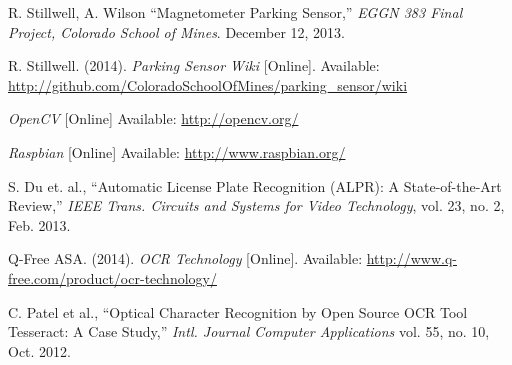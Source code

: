 \documentclass[11pt, oneside, fullpage, doublespace]{article}
\begin{document}
\begin{thebibliography}{99}
 R. Stillwell, A. Wilson ``Magnetometer Parking Sensor,'' \emph{EGGN 383 Final Project, Colorado School of Mines}. December 12, 2013.

 R. Stillwell. (2014). \emph{Parking Sensor Wiki} [Online]. Available: \url{http://github.com/ColoradoSchoolOfMines/parking_sensor/wiki}

 \emph{OpenCV} [Online] Available: \url{http://opencv.org/}

 \emph{Raspbian} [Online] Available: \url{http://www.raspbian.org/}

 S. Du et. al., ``Automatic License Plate Recognition (ALPR): A State-of-the-Art Review,'' \emph{IEEE Trans. Circuits and Systems for Video Technology}, vol. 23, no. 2, Feb. 2013.

 Q-Free ASA. (2014). \emph{OCR Technology} [Online]. Available: \url{http://www.q-free.com/product/ocr-technology/}

 C. Patel et al., ``Optical Character Recognition by Open Source OCR Tool Tesseract: A Case Study,'' \emph{Intl. Journal Computer Applications} vol. 55, no. 10, Oct. 2012.

\end{thebibliography}
\end{document}
